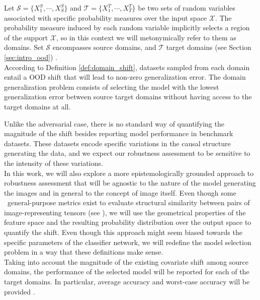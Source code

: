 \begin{definition}
    Let $\mathcal{S} = \{X^S_1, \cdots, X^S_S\}$ and $\mathcal{T} = \{X^T_1, \cdots, X^T_T\}$ 
    be two sets of random variables associated with specific probability measures 
    over the input space $\mathcal{X}$. The probability measure 
    induced by each random variable implicitly selects a region of
    the support $\mathcal{X}$, so in this context we will metonymically 
    refer to them as domains. Set $\mathcal{S}$ encompasses source domains,
    and $\mathcal{T}$ target domains (see Section \ref{sec:intro_ood})
    \cite{liuOutOfDistributionGeneralizationSurvey2023,wangGeneralizingUnseenDomains2022}. \\

    According to Definition \ref{def:domain_shift}, datasets sampled from each domain
    entail a OOD shift that will lead to non-zero generalization error. The 
    domain generalization problem consists of selecting the model with
    the lowest generalization error between source target domains without
    having access to the target domains at all. 
\end{definition}

Unlike the adversarial case, there is no standard way of quantifying
the magnitude of the shift besides reporting model performance in benchmark
datasets. These datasets encode specific variations in the causal structure generating
the data, and we expect our robustness assessment to be sensitive to the intensity
of these variations. \\

In this work, we will also explore a more epistemologically grounded
approach to robustness assessment that will be agnostic to the nature of the model
generating the images and in general to the concept of image itself. Even though some \
general-purpose metrics exist to evaluate structural similarity between pairs 
of image-representing tensors (see \cite{guoComprehensiveEvaluationFramework2023}),
we will use the geometrical properties of the feature space and the resulting
probability distribution over the output space to quantify the shift. Even though
this approach might seem biased towards the specific parameters of the classifier 
network, we will redefine the model selection problem in a way that these definitions
make sense.\\

Taking into account the magnitude of the existing covariate shift among source
domains, the performance of the selected model will be reported for each of
the target domains. In particular, average accuracy and worst-case accuracy
will be provided \cite{zhouDomainGeneralizationSurvey2022}.


